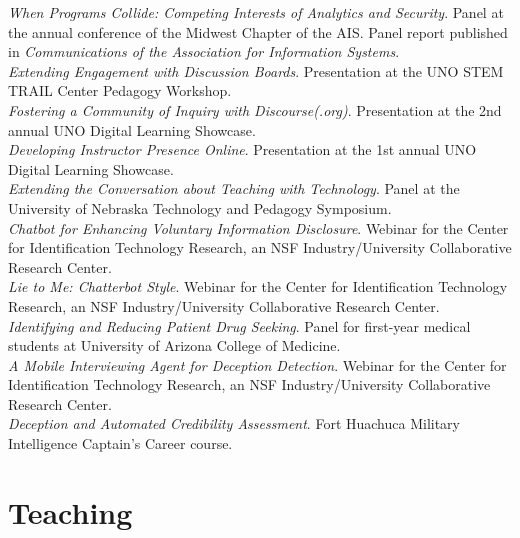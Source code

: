 \documentclass[10pt, letter]{article}
\newcommand{\years}[1]{\marginnote{\scriptsize #1}}
\begin{document}
\years{2019}\emph{When Programs Collide: Competing Interests of Analytics and Security}. Panel at the annual conference of the Midwest Chapter of the AIS. Panel report published in \emph{Communications of the Association for Information Systems}.\\

\years{}\emph{Extending Engagement with Discussion Boards}. Presentation at the UNO STEM TRAIL Center Pedagogy Workshop.\\

\years{}\emph{Fostering a Community of Inquiry with Discourse(.org)}. Presentation at the 2nd annual UNO Digital Learning Showcase.\\

\years{2018}\emph{Developing Instructor Presence Online}. Presentation at the 1st annual UNO Digital Learning Showcase.\\

\years{}\emph{Extending the Conversation about Teaching with Technology}. Panel at the University of Nebraska Technology and Pedagogy Symposium.\\

\years{2016}\emph{Chatbot for Enhancing Voluntary Information Disclosure}. Webinar for the Center for Identification
Technology Research, an NSF Industry/University Collaborative Research Center.\\

\years{2015}\emph{Lie to Me: Chatterbot Style}. Webinar for the Center for Identification
Technology Research, an NSF Industry/University Collaborative Research Center.\\

\years{2014}\emph{Identifying and Reducing Patient Drug Seeking}. Panel for first-year
medical students at University of Arizona College of Medicine.\\

\emph{A Mobile Interviewing Agent for Deception Detection}. Webinar for the
Center for Identification Technology Research, an NSF Industry/University Collaborative
Research Center.\\

\years{2012-2014}\emph{Deception and Automated Credibility Assessment}. Fort Huachuca
Military Intelligence Captain's Career course.


\section*{Teaching}
\end{document}
